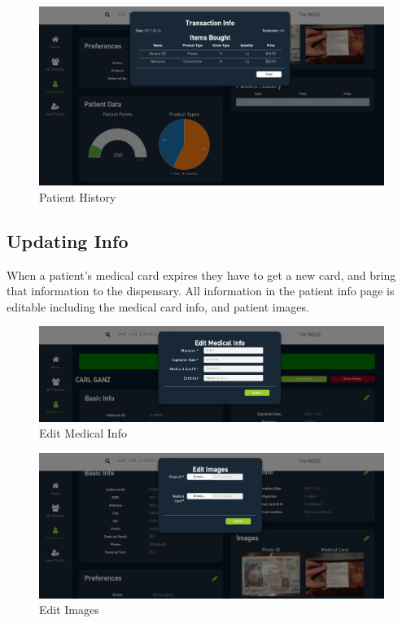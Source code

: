 \documentclass[]{book}
\theoremstyle{definition}
\theoremstyle{definition}
\theoremstyle{definition}
\theoremstyle{remark}
\begin{document}
\begin{figure}
\centering
\includegraphics{images/FD5.png}
\caption{Patient History}
\end{figure}

\subsection{Updating Info}\label{updating-info}

When a patient's medical card expires they have to get a new card, and
bring that information to the dispensary. All information in the patient
info page is editable including the medical card info, and patient
images.

\begin{figure}
\centering
\includegraphics{images/FD6.png}
\caption{Edit Medical Info}
\end{figure}

\begin{figure}
\centering
\includegraphics{images/FD7.png}
\caption{Edit Images}
\end{figure}
\end{document}
